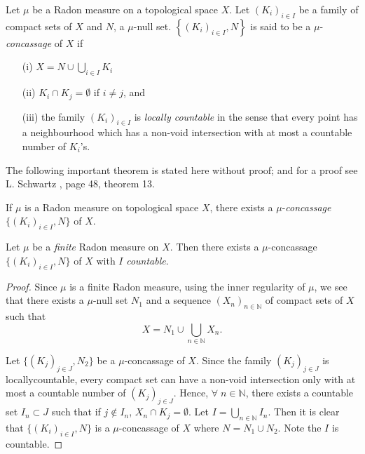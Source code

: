 \begin{defn}\label{part1:chap3:def33}
Let $\mu$ be a Radon measure on a topological space $X$. Let $(K_i)_{i
\in I}$ be a family of compact sets of $X$ and $N$, a $\mu$-null
set. $\left\{(K_i)_{i \in I}, N \right\}$ is said to be a $\mu$-{\em
  concassage}  of $X$ if 
\begin{itemize}
\item[{\rm (i)}] $X = N \cup \bigcup\limits_{i \in I} K_i$

\item[{\rm (ii)}] $K_i \cap K_j = \emptyset$ if $i \neq j$,  and 

\item[{\rm (iii)}] the family $(K_i)_{i \in I}$ is {\em locally
  countable} in the sense that every point has a neighbourhood which
  has a non-void intersection with at most a countable number of
  $K_i$'s. 
\end{itemize}

The following important theorem is stated here without proof; and for
a proof see L. Schwartz \cite{key2}, page 48, theorem 13. 
\end{defn}

\begin{theorem*}
If $\mu$ is a Radon measure on topological space $X$, there exists a
$\mu$-{\em concassage} $\{(K_i)_{i \in I}, N\}$ of $X$. 
\end{theorem*}

\begin{proposition}\label{part1:chap3:prop34}
Let $\mu$ be a {\em finite} Radon measure on $X$. Then there exists a
$\mu$-concassage $\{(K_i)_{i \in I} , N\}$ of $X$ with $I$ {\em
  countable}. 
\end{proposition}

\begin{proof}
Since $\mu$ is a finite Radon measure, using the inner regularity of
$\mu$, we see that there exists a $\mu$-null set $N_1$ and a sequence
$(X_n)_{n \in\mathbb{N}}$ of compact sets of $X$ such that 
$$
X = N_1 \cup \bigcup\limits_{n \in\mathbb{N}} X_n . 
$$

Let $\{(K_j)_{j \in J}, N_2\}$ be a $\mu$-concassage of $X$. Since the
family $(K_j)_{j \in J}$ is locally\pageoriginale countable, every
compact set can have a non-void intersection only with at most a
countable number of $(K_j)_{j \in J}$. Hence, $\forall \; n \in
\mathbb{N}$, there exists a countable set $I_n \subset J$ such that
if $j \not\in I_n$, $X_n \cap K_j = \emptyset$. Let $I =
\bigcup\limits_{n \in\mathbb{N}} I_n$. Then it is clear that
$\{(K_i)_{i \in I}, N\}$ is a $\mu$-concassage of $X$ where $N = N_1
\cup N_2$. Note the $I$ is countable. 
\end{proof}


